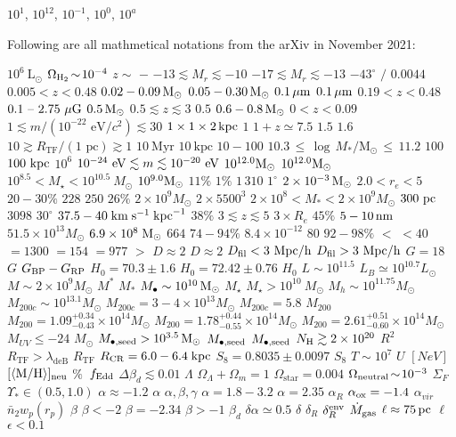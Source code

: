 $10^{1}$, $10^{12}$, $10^{-1}$, $10^0$, $10^{a}$

Following are all mathmetical notations from the arXiv in November 2021:

$ 10^6 ~ \mathrm{L}_\odot$  $ \Omega_{\rm H_2} \! \sim \! 10^{-4}$  $ z\!\sim$  $-$  $-13 \lesssim M_r \lesssim -10$  $-17 \lesssim M_r \lesssim -13$  $-43^{\circ}$  $/$  $0.0044$  $0.005 < z < 0.48$  $0.02-0.09 \, {\rm M}_\odot$  $0.05-0.30 \, {\rm M}_\odot$  $0.1 \, {\rm \mu m}$  $0.1 \, {\rm \mu m}$  $0.19<z<0.48$  $0.1~\text{--}~2.75~\mu{\rm G}$  $0.5 \, {\rm M}_\odot$  $0.5 \lesssim z \lesssim 3$  $0.5$  $0.6-0.8 \, {\rm M}_\odot$  $0<z<0.09$  $1 \lesssim m/(10^{-22} \text{ eV}/c^2) \lesssim 30$  $1 \times 1 \times 2 \, {\rm kpc}$  $1$  $1+z\simeq 7.5$  $1.5$  $1.6$  $10 \gtrsim R_\text{TF}/(1 \text{ pc}) \gtrsim 1$  $10 ~\text{Myr}$  $10 ~\text{kpc}$  $10-100$ $10.3\,\leqslant\,\log\,M_{\ast}/\mathrm{M_{\odot}}\,\leqslant\,11.2$ $100$ $100~{\rm kpc}$ $10^6$ $10^{-24}~{\rm eV}\lesssim m\lesssim10^{-20}~{\rm eV}$ $10^{12.0}\rm{M_{\odot}}$ $10^{12.0}{\rm M_\odot}$ $10^{8.5}<M_\star<10^{10.5}~M_\odot$ $10^{9.0}{\rm M_\odot}$  $11\%$  $1\%$  $1\,310$  $1^\circ$  $2 \times 10^{-3} \, {\rm M}_\odot$  $2.0<r_e<5$  $20-30\%$  $228$  $250$  $26\%$  $2\times 10^9 M_\odot$  $2\times 5500^3$  $2\times10^8<M_*<2\times10^9 M_{\odot}$  $300~{\rm pc}$  $3098$  $30^\circ$  $37.5-40\; {\rm km}\;{\rm s}^{-1}\;{\rm kpc}^{-1}$  $38\%$  $3\lesssim{} z \lesssim{} 5$  $3\times R_e$  $45\%$  $5-10 {\, {\rm nm}}$  $51.5\times 10^{13} M_\odot$  $6.9\times10^8\; {\rm M}_{\odot}$  $664$  $74-94 \%$  $8.4 \times 10^{-12}$  $80$  $92-98 \%$  $<$  $<40$  $=1300$  $=154$  $=977$  $>$  $D \approx 2$  $D\approx 2$  $D_{\rm{fil}}<3\ \rm{Mpc}/h$  $D_{\rm{fil}}>3\ \rm{Mpc}/h$  $G = 18$  $G$  $G_{\rm BP} - G_{\rm RP}$  $H_0 = 70.3 \pm 1.6$  $H_0 = 72.42 \pm 0.76$  $H_0$  $L \sim 10^{11.5}$  $L_B\simeq 10^{10.7}L_\odot$  $M \sim 2\times 10^9 M_\odot$  $M^*$  $M_*$  $M_\bullet \sim 10^{10} \,{\rm M_\odot}$  $M_\star$  $M_\star>10^{10}~M_\odot$  $M_h \sim 10^{11.75} M_\odot$  $M_{200c} \sim 10^{13.1} M_{\odot}$  $M_{200c}=3-4 \times 10^{13}M_\odot$  $M_{200c}=5.8$  $M_{200}$  $M_{200}=1.09_{-0.43}^{+0.34}\times10^{14} M_{\odot}$  $M_{200}=1.78_{-0.55}^{+0.44}\times10^{14} M_{\odot}$  $M_{200}=2.61_{-0.60}^{+0.51}\times10^{14} M_{\odot}$  $M_{UV} \leq -24$  $M_{\odot}$  $M_{\rm \bullet, seed} > 10^{3.5} \,{\rm M_\odot}$  $M_{\rm \bullet, seed}$  $M_{\rm \bullet, seed}$  $N_{\rm H} \gtrsim 2\times10^{20}$  $R^2$  $R_\text{TF} > \lambda_\text{deB}$  $R_\text{TF}$  $R_{\rm CR}=6.0-6.4\;{\rm kpc}$  $S_8 = 0.8035 \pm 0.0097$  $S_8$  $T\sim 10^7$  $U$  $[NeV]$  $[\langle{}{\rm M/H}\rangle{}]_{\rm neu}$  $\%$  $\,f_{\rm Edd}$  $\Delta\beta_d \lesssim 0.01$  $\Lambda$  $\Omega_\Lambda+\Omega_m=1$  $\Omega_\mathrm{star}=0.004$  $\Omega_{\rm neutral} \!\sim\! 10^{-3}$  $\Sigma_F$  $\Upsilon_* \in (0.5, 1.0)$  $\alpha \approx -1.2$  $\alpha$  $\alpha,\beta,\gamma$  $\alpha=1.8-3.2$  $\alpha=2.35$  $\alpha_R$  $\alpha_{\rm ox}=-1.4$  $\alpha_{vir}$  $\bar{n}_2w_p(r_p)$  $\beta$  $\beta<-2$  $\beta=-2.34$  $\beta>-1$  $\beta_d$  $\delta \alpha\simeq 0.5$  $\delta$  $\delta_R$  $\delta_R^{\rm env}$  $\dot{M}_{\rm{gas}}$  $\ell \approx 75 \, {\rm pc}$  $\ell$  $\epsilon < 0.1$  